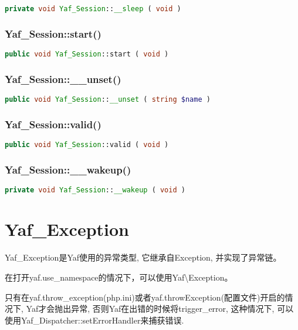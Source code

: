 \begin{lstlisting}[language=PHP]
private void Yaf_Session::__sleep ( void )
\end{lstlisting}


\subsection{Yaf\_Session::start()}


\begin{lstlisting}[language=PHP]
public void Yaf_Session::start ( void )
\end{lstlisting}

\subsection{Yaf\_Session::\_\_unset()}

\begin{lstlisting}[language=PHP]
public void Yaf_Session::__unset ( string $name )
\end{lstlisting}


\subsection{Yaf\_Session::valid()}

\begin{lstlisting}[language=PHP]
public void Yaf_Session::valid ( void )
\end{lstlisting}

\subsection{Yaf\_Session::\_\_wakeup()}



\begin{lstlisting}[language=PHP]
private void Yaf_Session::__wakeup ( void )
\end{lstlisting}




\chapter{Yaf\_Exception}

Yaf\_Exception是Yaf使用的异常类型, 它继承自Exception, 并实现了异常链。

在打开yaf.use\_namespace的情况下，可以使用Yaf\textbackslash Exception。

只有在yaf.throw\_exception(php.ini)或者yaf.throwException(配置文件)开启的情况下, Yaf才会抛出异常, 否则Yaf在出错的时候将trigger\_error, 这种情况下, 可以使用Yaf\_Dispatcher::setErrorHandler来捕获错误.


